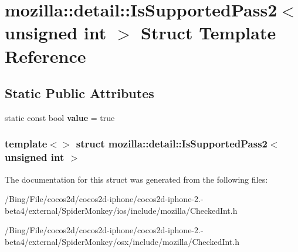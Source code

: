 \hypertarget{structmozilla_1_1detail_1_1_is_supported_pass2_3_01unsigned_01int_01_4}{\section{mozilla\-:\-:detail\-:\-:Is\-Supported\-Pass2$<$ unsigned int $>$ Struct Template Reference}
\label{structmozilla_1_1detail_1_1_is_supported_pass2_3_01unsigned_01int_01_4}
}
\subsection*{Static Public Attributes}
\begin{DoxyCompactItemize}
\item 
\hypertarget{structmozilla_1_1detail_1_1_is_supported_pass2_3_01unsigned_01int_01_4_a23920a616d7b32684694c101c5121cc9}{static const bool {\bfseries value} = true}\label{structmozilla_1_1detail_1_1_is_supported_pass2_3_01unsigned_01int_01_4_a23920a616d7b32684694c101c5121cc9}

\end{DoxyCompactItemize}
\subsubsection*{template$<$$>$ struct mozilla\-::detail\-::\-Is\-Supported\-Pass2$<$ unsigned int $>$}



The documentation for this struct was generated from the following files\-:\begin{DoxyCompactItemize}
\item 
/\-Bing/\-File/cocos2d/cocos2d-\/iphone/cocos2d-\/iphone-\/2.-\/beta4/external/\-Spider\-Monkey/ios/include/mozilla/Checked\-Int.\-h\item 
/\-Bing/\-File/cocos2d/cocos2d-\/iphone/cocos2d-\/iphone-\/2.-\/beta4/external/\-Spider\-Monkey/osx/include/mozilla/Checked\-Int.\-h\end{DoxyCompactItemize}
